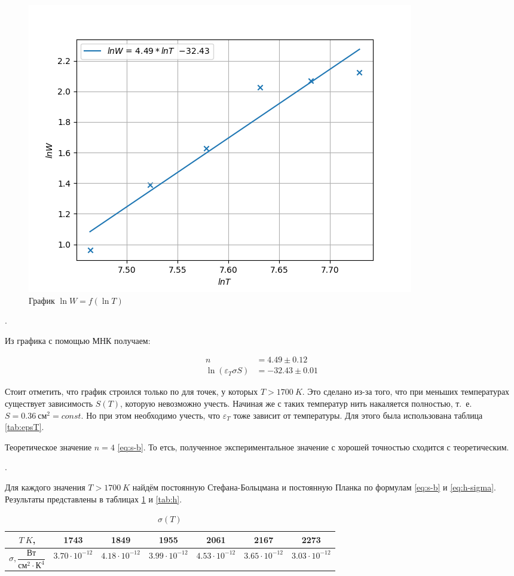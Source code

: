 \documentclass[a4paper, 12pt]{article}
\newcounter{Points}
\newcommand{\point}{\arabic{Points}. \addtocounter{Points}{1}}
\begin{document}
\begin{figure}[H]
    \includegraphics{log_plot.png}
    \centering
    \caption{График $\ln W = f(\ln T)$}
    \label{pic:lnW}
\end{figure}


\point Из графика с помощью МНК получаем:

\begin{align*}
    n &= 4.49 \pm 0.12 \\
    \ln (\varepsilon_T \sigma S) &= -32.43 \pm 0.01
\end{align*}

Стоит отметить, что график строился только по для точек, у которых $T > 1700~K$. Это сделано из-за того, что при меньших температурах существует зависимость $S(T)$, которую невозможно учесть. Начиная же с таких температур нить накаляется полностью, т.~е. $S = 0.36~см^2 = const$. Но при этом необходимо учесть, что $\varepsilon_T$ тоже зависит от температуры. Для этого была использована таблица \ref{tab:epsT}.

Теоретическое значение $n = 4$ \eqref{eq:s-b}. То етсь, полученное экспериментальное значение с хорошей точностью сходится с теоретическим.


\point Для каждого значения $T > 1700~K$ найдём постоянную Стефана-Больцмана и постоянную Планка по формулам \eqref{eq:s-b} и  \eqref{eq:h-sigma}. Результаты представлены в таблицах \ref{tab:sigma} и \ref{tab:h}.

\begin{table}[H]
    \centering
    \begin{tabular}{|c|c|c|c|c|c|c|}
        \hline
        $T~K$,   &  1743	 & 1849	 & 1955	 & 2061	 & 2167	 & 2273	\\ \hline

        $\sigma, \dfrac{Вт}{см^2 \cdot К^4}$ & $3.70 \cdot 10^{-12}$	 & $4.18 \cdot 10^{-12}$	 & $3.99 \cdot 10^{-12}$	 & $4.53 \cdot 10^{-12}$	 & $3.65 \cdot 10^{-12}$	 & $3.03 \cdot 10^{-12}$	 \\ \hline
    \end{tabular}
    \caption {$\sigma (T)$}
    \label{tab:sigma}
\end{table}
\end{document}
